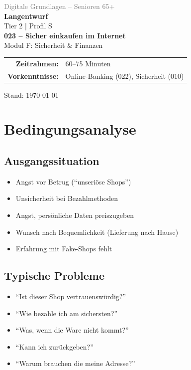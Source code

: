 \documentclass[11pt,a4paper]{article}
\begin{document}
\begin{titlepage}
    \centering
    \vspace*{2cm}
    {\Large\textcolor{gray}{Digitale Grundlagen -- Senioren 65+}}\\[2cm]
    {\Huge\textcolor{fach}{\textbf{Langentwurf}}}\\[0.5cm]
    {\large Tier 2 | Profil S}\\[2cm]
    {\LARGE\textbf{023 -- Sicher einkaufen im Internet}}\\[0.5cm]
    {\large Modul F: Sicherheit \& Finanzen}\\[2cm]
    \begin{tabular}{rl}
        \textbf{Zeitrahmen:} & 60--75 Minuten \\
        \textbf{Vorkenntnisse:} & Online-Banking (022), Sicherheit (010) \\
    \end{tabular}
    \vfill
    {\normalsize Stand: \today}
\end{titlepage}

\tableofcontents
\newpage

\section{Bedingungsanalyse}

\subsection{Ausgangssituation}
\begin{itemize}
    \item Angst vor Betrug (``unseriöse Shops'')
    \item Unsicherheit bei Bezahlmethoden
    \item Angst, persönliche Daten preiszugeben
    \item Wunsch nach Bequemlichkeit (Lieferung nach Hause)
    \item Erfahrung mit Fake-Shops fehlt
\end{itemize}

\subsection{Typische Probleme}
\begin{itemize}
    \item ``Ist dieser Shop vertrauenswürdig?''
    \item ``Wie bezahle ich am sichersten?''
    \item ``Was, wenn die Ware nicht kommt?''
    \item ``Kann ich zurückgeben?''
    \item ``Warum brauchen die meine Adresse?''
\end{itemize}
\end{document}
